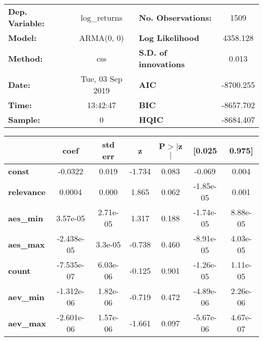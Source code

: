 \begin{center}
\begin{tabular}{lclc}
\toprule
\textbf{Dep. Variable:} &   log\_returns   & \textbf{  No. Observations:  } &    1509     \\
\textbf{Model:}         &    ARMA(0, 0)    & \textbf{  Log Likelihood     } &  4358.128   \\
\textbf{Method:}        &       css        & \textbf{  S.D. of innovations} &   0.013     \\
\textbf{Date:}          & Tue, 03 Sep 2019 & \textbf{  AIC                } & -8700.255   \\
\textbf{Time:}          &     13:42:47     & \textbf{  BIC                } & -8657.702   \\
\textbf{Sample:}        &        0         & \textbf{  HQIC               } & -8684.407   \\
\bottomrule
\end{tabular}
\begin{tabular}{lcccccc}
                   & \textbf{coef} & \textbf{std err} & \textbf{z} & \textbf{P$> |$z$|$} & \textbf{[0.025} & \textbf{0.975]}  \\
\midrule
\textbf{const}     &      -0.0322  &        0.019     &    -1.734  &         0.083        &       -0.069    &        0.004     \\
\textbf{relevance} &       0.0004  &        0.000     &     1.865  &         0.062        &    -1.85e-05    &        0.001     \\
\textbf{aes\_min}  &     3.57e-05  &     2.71e-05     &     1.317  &         0.188        &    -1.74e-05    &     8.88e-05     \\
\textbf{aes\_max}  &   -2.438e-05  &      3.3e-05     &    -0.738  &         0.460        &    -8.91e-05    &     4.03e-05     \\
\textbf{count}     &   -7.535e-07  &     6.03e-06     &    -0.125  &         0.901        &    -1.26e-05    &     1.11e-05     \\
\textbf{aev\_min}  &   -1.312e-06  &     1.82e-06     &    -0.719  &         0.472        &    -4.89e-06    &     2.26e-06     \\
\textbf{aev\_max}  &   -2.601e-06  &     1.57e-06     &    -1.661  &         0.097        &    -5.67e-06    &     4.67e-07     \\
\bottomrule
\end{tabular}
\end{center}
